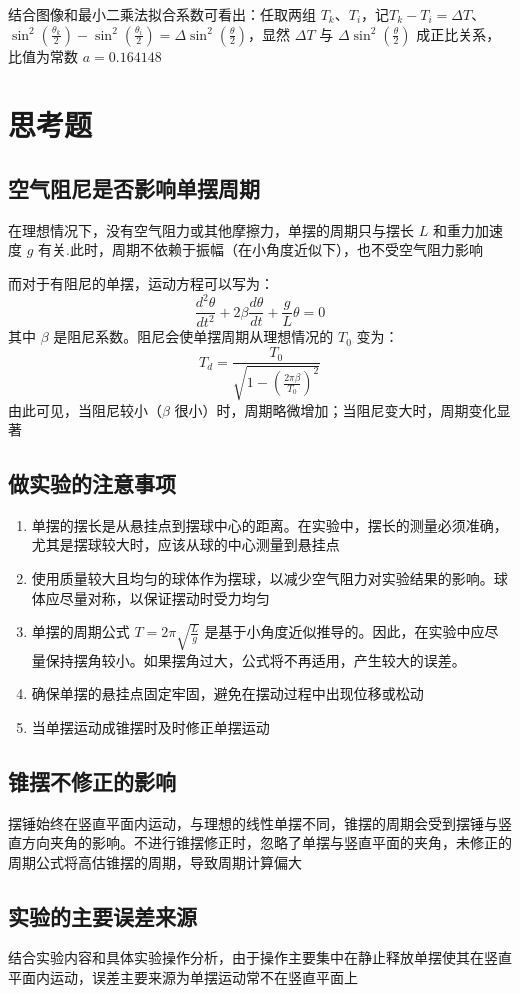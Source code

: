 \documentclass[UTF8]{ctexart}
\begin{document}
结合图像和最小二乘法拟合系数可看出：任取两组 $T_k$、$T_i$，记$T_k - T_i = \Delta T$、$\sin^2(\frac{\theta_k}{2}) - \sin^2(\frac{\theta_i}{2})= \Delta \sin^2(\frac{\theta}{2})$，显然 $\Delta T$ 与 $ \Delta \sin^2(\frac{\theta}{2})$ 成正比关系，比值为常数 $a = 0.164148$



\section{思考题}
\subsection{空气阻尼是否影响单摆周期}
在理想情况下，没有空气阻力或其他摩擦力，单摆的周期只与摆长 $L$ 和重力加速度 $g$ 有关.此时，周期不依赖于振幅（在小角度近似下），也不受空气阻力影响

而对于有阻尼的单摆，运动方程可以写为：
\[
\frac{d^2\theta}{dt^2} + 2\beta \frac{d\theta}{dt} + \frac{g}{L}\theta = 0
\]
其中 $\beta$ 是阻尼系数。阻尼会使单摆周期从理想情况的 $T_0$ 变为：
\[
T_d = \frac{T_0}{\sqrt{1 - \left(\frac{2\pi\beta}{T_0}\right)^2}}
\]
由此可见，当阻尼较小（$\beta$ 很小）时，周期略微增加；当阻尼变大时，周期变化显著
\subsection{做实验的注意事项}
\begin{enumerate}
    \item 单摆的摆长是从悬挂点到摆球中心的距离。在实验中，摆长的测量必须准确，尤其是摆球较大时，应该从球的中心测量到悬挂点
    \item 使用质量较大且均匀的球体作为摆球，以减少空气阻力对实验结果的影响。球体应尽量对称，以保证摆动时受力均匀
    \item 单摆的周期公式 $T = 2\pi \sqrt{\frac{L}{g}}$ 是基于小角度近似推导的。因此，在实验中应尽量保持摆角较小。如果摆角过大，公式将不再适用，产生较大的误差。
    \item 确保单摆的悬挂点固定牢固，避免在摆动过程中出现位移或松动
    \item 当单摆运动成锥摆时及时修正单摆运动
\end{enumerate}

\subsection{锥摆不修正的影响}
摆锤始终在竖直平面内运动，与理想的线性单摆不同，锥摆的周期会受到摆锤与竖直方向夹角的影响。不进行锥摆修正时，忽略了单摆与竖直平面的夹角，未修正的周期公式将高估锥摆的周期，导致周期计算偏大

\subsection{实验的主要误差来源}
结合实验内容和具体实验操作分析，由于操作主要集中在静止释放单摆使其在竖直平面内运动，误差主要来源为单摆运动常不在竖直平面上
\end{document}
